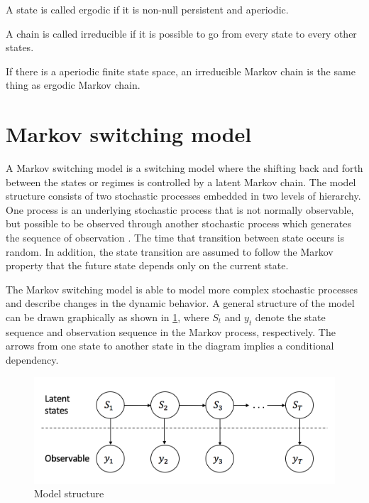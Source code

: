 \begin{defn}
\citep[p.222]{grimmett2001probability} A state is called ergodic
if it is non-null persistent and aperiodic.
\end{defn}

\begin{defn}
A chain is called irreducible if it is possible to go from every state
to every other states.
\end{defn}

\begin{thm*}
\citep{manning2008introduction} If there is a aperiodic finite state
space, an irreducible Markov chain is the same thing as ergodic Markov
chain. 
\end{thm*}

\section{Markov switching model}

A Markov switching model is a switching model where the shifting back
and forth between the states or regimes is controlled by a latent
Markov chain. The model structure consists of two stochastic processes
embedded in two levels of hierarchy. One process is an underlying
stochastic process that is not normally observable, but possible to
be observed through another stochastic process which generates the
sequence of observation \citep{rabiner1986introduction}. The time
that transition between state occurs is random. In addition, the state
transition are assumed to follow the Markov property that the future
state depends only on the current state. 

The Markov switching model is able to model more complex stochastic
processes and describe changes in the dynamic behavior. A general
structure of the model can be drawn graphically as shown in \ref{msm},
where $S_{t}$ and $y_{t}$ denote the state sequence and observation
sequence in the Markov process, respectively. The arrows from one
state to another state in the diagram implies a conditional dependency. 

\begin{figure}[H]
\begin{centering}
\includegraphics[scale=0.7]{picture/msm1}
\par\end{centering}
\caption{Model structure}
\label{msm}
\end{figure}

